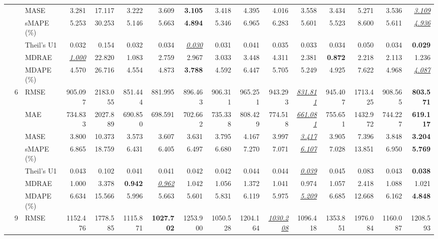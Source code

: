 \begin{table}[!htbp]
{\begin{tabular}{lllrrrrrrrrrrrrr}
 &  & MASE & 3.281 & 17.117 & 3.222 & 3.609 & \textbf{3.105} & 3.418 & 4.395 & 4.016 & 3.558 & 3.434 & 5.271 & 3.536 & \underline{\textit{3.109}} \\
 &  & sMAPE (\%) & 5.253 & 30.253 & 5.146 & 5.663 & \textbf{4.894} & 5.346 & 6.965 & 6.283 & 5.601 & 5.523 & 8.600 & 5.611 & \underline{\textit{4.936}} \\
 &  & Theil's U1 & 0.032 & 0.154 & 0.032 & 0.034 & \underline{\textit{0.030}} & 0.031 & 0.041 & 0.035 & 0.033 & 0.034 & 0.050 & 0.034 & \textbf{0.029} \\
 &  & MDRAE & \underline{\textit{1.000}} & 22.820 & 1.083 & 2.759 & 2.967 & 3.033 & 3.448 & 4.311 & 2.381 & \textbf{0.872} & 2.218 & 2.113 & 1.236 \\
 &  & MDAPE (\%) & 4.570 & 26.716 & 4.554 & 4.873 & \textbf{3.788} & 4.592 & 6.447 & 5.705 & 5.249 & 4.925 & 7.622 & 4.968 & \underline{\textit{4.087}} \\
\cmidrule(lr){2-16}
 & 6 & RMSE & 905.097 & 2183.055 & 851.444 & 881.995 & 896.463 & 906.311 & 965.251 & 943.293 & \underline{\textit{831.811}} & 945.407 & 1713.425 & 908.565 & \textbf{803.571} \\
 &  & MAE & 734.833 & 2027.889 & 690.850 & 698.591 & 702.662 & 735.338 & 808.429 & 774.518 & \underline{\textit{661.081}} & 755.651 & 1432.972 & 744.227 & \textbf{619.117} \\
 &  & MASE & 3.800 & 10.373 & 3.573 & 3.607 & 3.631 & 3.795 & 4.167 & 3.997 & \underline{\textit{3.417}} & 3.905 & 7.396 & 3.848 & \textbf{3.204} \\
 &  & sMAPE (\%) & 6.865 & 18.759 & 6.431 & 6.405 & 6.497 & 6.680 & 7.270 & 7.071 & \underline{\textit{6.107}} & 7.028 & 13.851 & 6.950 & \textbf{5.769} \\
 &  & Theil's U1 & 0.043 & 0.102 & 0.041 & 0.041 & 0.042 & 0.042 & 0.044 & 0.044 & \underline{\textit{0.039}} & 0.045 & 0.083 & 0.043 & \textbf{0.038} \\
 &  & MDRAE & 1.000 & 3.378 & \textbf{0.942} & \underline{\textit{0.962}} & 1.042 & 1.056 & 1.372 & 1.041 & 0.974 & 1.057 & 2.418 & 1.088 & 1.021 \\
 &  & MDAPE (\%) & 6.634 & 15.566 & 5.996 & 5.663 & 5.601 & 5.831 & 6.119 & 5.975 & \underline{\textit{5.209}} & 6.685 & 12.668 & 6.162 & \textbf{4.848} \\
\cmidrule(lr){2-16}
 & 9 & RMSE & 1152.476 & 1778.585 & 1115.871 & \textbf{1027.702} & 1253.900 & 1050.528 & 1204.164 & \underline{\textit{1030.208}} & 1096.418 & 1353.851 & 1976.084 & 1160.087 & 1208.593 \\

\end{tabular}}
\end{table}
